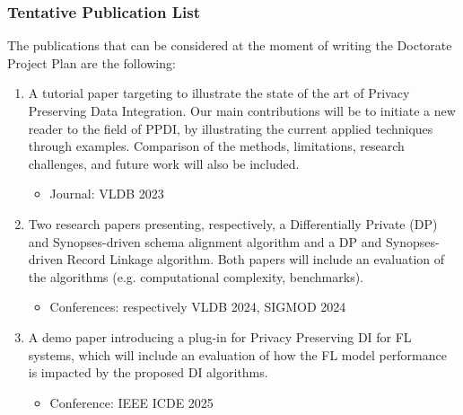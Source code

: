 \documentclass[12pt]{article}
\begin{document}
\subsubsection{Tentative Publication List}
The publications that can be considered at the moment of writing the Doctorate Project Plan are the
following:
\begin{enumerate}
   \item A tutorial paper targeting to illustrate the state of the art of Privacy Preserving Data Integration. Our
   main contributions will be to initiate a new reader to the field of PPDI,
   by illustrating the current applied techniques through examples. Comparison of the methods,
   limitations, research challenges, and future work will also be included.
   \begin{itemize}
      \item Journal: VLDB 2023
   \end{itemize}

   \item Two research papers presenting, respectively, a Differentially Private (DP) and Synopses-driven schema 
   alignment algorithm and a DP and Synopses-driven Record Linkage algorithm. Both papers will include an evaluation of the algorithms (e.g. computational complexity, benchmarks).
   \begin{itemize}
      \item Conferences: respectively VLDB 2024, SIGMOD 2024
   \end{itemize}
   \item A demo paper introducing a plug-in for Privacy Preserving DI for FL systems, which will include an evaluation of how 
   the FL model performance is impacted by the proposed DI algorithms.
   \begin{itemize}
      \item Conference: IEEE ICDE 2025
   \end{itemize}
\end{enumerate}


\end{document}
